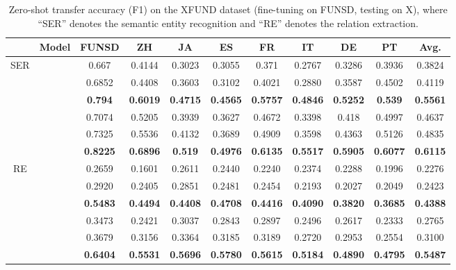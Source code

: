 \documentclass[11pt]{article}
\newcommand{\task}{\textsc{XFUND}\xspace}
\begin{document}
\begin{table*}[ht]
	\small
	\centering
	\begin{tabular}{c|lccccccccc}
		\toprule
& \multicolumn{1}{c}{\bf Model}      & \bf FUNSD & \bf ZH & \bf JA & \bf ES & \bf FR & \bf IT & \bf DE & \bf PT & \bf Avg. \\\midrule
		\multirow{6}{*}{SER} &   & 0.667  & 0.4144 & 0.3023 & 0.3055 & 0.371  & 0.2767 & 0.3286 & 0.3936 & 0.3824 \\
		                    &  & 0.6852 & 0.4408 & 0.3603 & 0.3102 & 0.4021 & 0.2880 & 0.3587 & 0.4502 & 0.4119 \\
		                    &     & \bf 0.794  & \bf 0.6019 & \bf 0.4715 & \bf 0.4565 & \bf 0.5757 & \bf 0.4846 & \bf 0.5252 & \bf 0.539 & \bf 0.5561 \\ \cmidrule{2-11}
		                    &  & 0.7074 & 0.5205 & 0.3939 & 0.3627 & 0.4672 & 0.3398 & 0.418  & 0.4997 & 0.4637 \\
		                    &      & 0.7325 & 0.5536 & 0.4132 & 0.3689 & 0.4909 & 0.3598 & 0.4363 & 0.5126 & 0.4835 \\
		                    &    & \bf 0.8225 & \bf 0.6896 & \bf 0.519  & \bf 0.4976 & \bf 0.6135 & \bf 0.5517 & \bf 0.5905 & \bf 0.6077 & \bf 0.6115 \\\midrule
		\multirow{6}{*}{RE} &   & 0.2659 & 0.1601 & 0.2611 & 0.2440 & 0.2240 & 0.2374 & 0.2288 & 0.1996 & 0.2276 \\
		                    &       & 0.2920 & 0.2405 & 0.2851 & 0.2481 & 0.2454 & 0.2193 & 0.2027 & 0.2049 & 0.2423 \\
		                    &     & \bf 0.5483 & \bf 0.4494 & \bf 0.4408 & \bf 0.4708 & \bf 0.4416 & \bf 0.4090 & \bf 0.3820 & \bf 0.3685 & \bf 0.4388 \\ \cmidrule{2-11}
		                    &  & 0.3473 & 0.2421 & 0.3037 & 0.2843 & 0.2897 & 0.2496 & 0.2617 & 0.2333 & 0.2765 \\
		                    &      & 0.3679 & 0.3156 & 0.3364 & 0.3185 & 0.3189 & 0.2720 & 0.2953 & 0.2554 & 0.3100 \\
		                    &    & \bf 0.6404 & \bf 0.5531 & \bf 0.5696 & \bf 0.5780 & \bf 0.5615 & \bf 0.5184 & \bf 0.4890 & \bf 0.4795 \bf & \bf 0.5487 \\
		\bottomrule
	\end{tabular}
	\caption{Zero-shot transfer accuracy (F1) on the \task dataset (fine-tuning on FUNSD, testing on X), where ``SER'' denotes the semantic entity recognition and ``RE'' denotes the relation extraction.}
	\label{tab:e2x}
\end{table*}
\end{document}
